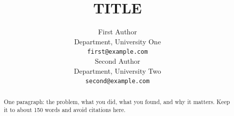 \documentclass{article}
\title{{{TITLE}}}
\author{%
  First Author \\
  Department, University One \\
  \texttt{first@example.com} \\
  \And
  Second Author \\
  Department, University Two \\
  \texttt{second@example.com} \\
}
\begin{document}
\maketitle

\begin{abstract}
One paragraph: the problem, what you did, what you found, and why it matters. Keep it to about 150 words and avoid citations here.
\end{abstract}






\end{document}
